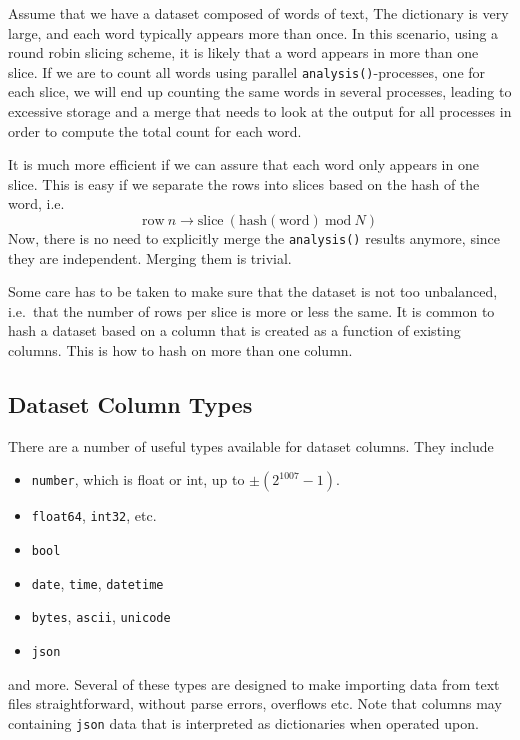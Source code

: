 \documentclass[a4paper]{article}
\begin{document}
Assume that we have a dataset composed of words of text, The
dictionary is very large, and each word typically appears more than
once.  In this scenario, using a round robin slicing scheme, it is
likely that a word appears in more than one slice.  If we are to count
all words using parallel \texttt{analysis()}-processes, one for each
slice, we will end up counting the same words in several processes,
leading to excessive storage and a merge that needs to look at the
output for all processes in order to compute the total count for each
word.

It is much more efficient if we can assure that each word only appears
in one slice.  This is easy if we separate the rows into slices based
on the hash of the word, i.e.
\begin{equation}
  \textrm{row}~n \longrightarrow \textrm{slice}~(\textrm{hash}(\textrm{word})~\textrm{mod}~N)
\end{equation}
Now, there is no need to explicitly merge the \texttt{analysis()}
results anymore, since they are independent.  Merging them is trivial.

Some care has to be taken to make sure that the dataset is not too
unbalanced, i.e.\ that the number of rows per slice is more or less
the same.  It is common to hash a dataset based on a column that is
created as a function of existing columns.  This is how to hash on
more than one column.







\clearpage



\subsection{Dataset Column Types}
\label{sec:dataset-typing}
There are a number of useful types available for dataset columns.  They include
\begin{itemize}
  \item[] \texttt{number}, which is float or int, up to $\pm(2^{1007}-1)$.
  \item[] \texttt{float64}, \texttt{int32}, etc.
  \item[] \texttt{bool}
  \item[] \texttt{date}, \texttt{time}, \texttt{datetime}
  \item[] \texttt{bytes}, \texttt{ascii}, \texttt{unicode}
  \item[] \texttt{json}
\end{itemize}
and more.  Several of these types are designed to make importing data
from text files straightforward, without parse errors, overflows etc.
Note that columns may containing \texttt{json} data that is
interpreted as dictionaries when operated upon.
\end{document}
